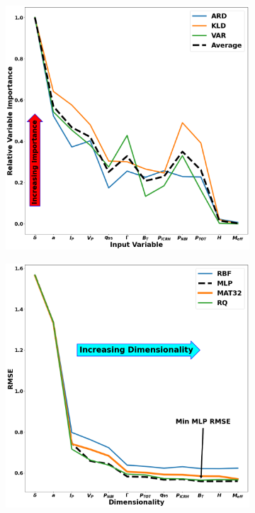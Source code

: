 \documentclass[a4paper, twoside, final, 12pt]{article}
\begin{document}
{\begin{figure}
	\begin{subfigure}{0.48\linewidth}
		\centering
		\includegraphics[scale=0.2]{ ./src/GP_sensitivity_analysis_final_v1}
	\end{subfigure}\hfill
	\begin{subfigure}{0.48\linewidth}
		\centering
		\includegraphics[scale=0.2]{ ./src/final_GP_dim_v2}

\end{subfigure}
\end{figure}}
\end{document}
